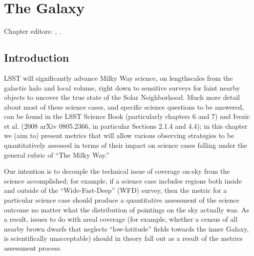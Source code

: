 \chapter[The Galaxy]{The Galaxy}
\def\chpname{galaxy}\label{chp:\chpname}

Chapter editors:
,
.


\section{Introduction}
\def\secname{intro}\label{sec:\secname}


LSST will significantly advance Milky Way science, on lengthscales
from the galactic halo and local volume, right down to sensitive
surveys for faint nearby objects to uncover the true state of the
Solar Neighborhood.
Much more detail about most of these science cases, and specific
science questions to be answered, can be found in the LSST Science
Book (particularly chapters 6 and 7) and Ivezic et al. (2008 arXiv
0805.2366, in particular Sections 2.1.4 and 4.4); in this chapter we
(aim to) present metrics that will allow various observing strategies
to be quantitatively assessed in terms of their impact on science
cases falling under the general rubric of ``The Milky Way.''

Our intention is to decouple the technical issue of coverage on-sky
from the science accomplished; for example, if a science case includes
regions both inside and outside of the ``Wide-Fast-Deep'' (WFD)
survey, then the metric for a particular science case should produce a
quantitative assessment of the science outcome no matter what the
distribution of pointings on the sky actually was. As a result, issues
to do with areal coverage (for example, whether a census of all nearby
brown dwarfs that neglects ``low-latitude'' fields towards the inner
Galaxy, is scientifically unacceptable) should in theory fall out as a
result of the metrics assessment process.

